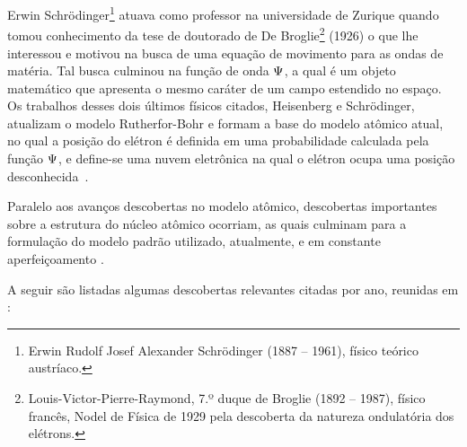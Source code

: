 Erwin Schrödinger\footnote{Erwin Rudolf Josef Alexander Schrödinger (1887 -- 1961), físico teórico austríaco.} atuava como professor na universidade de Zurique quando tomou conhecimento da tese de doutorado de De Broglie\footnote{Louis-Victor-Pierre-Raymond, 7.º duque de Broglie (1892 -- 1987), físico francês, Nodel de Física de 1929 pela descoberta da natureza ondulatória dos elétrons.} (1926) o que lhe interessou e motivou na busca de uma equação de movimento para as ondas de matéria. Tal busca culminou na função de onda $\mathbf\mathrm{\Psi}$, a qual é um objeto matemático que apresenta o mesmo caráter de um campo estendido no espaço. Os trabalhos desses dois últimos físicos citados, Heisenberg e Schrödinger, atualizam o modelo Rutherfor-Bohr e formam a base do modelo atômico atual, no qual a posição do elétron é definida em uma probabilidade calculada pela função $\mathbf\mathrm{\Psi}$, e define-se uma nuvem eletrônica na qual o elétron ocupa uma posição desconhecida~\cite{book:rocha2002}.

Paralelo aos avanços descobertas no modelo atômico, descobertas importantes sobre a estrutura do núcleo atômico ocorriam, as quais culminam para a formulação do modelo padrão utilizado, atualmente, e em constante aperfeiçoamento \cite{book:pinheiro2011}. 

A seguir são listadas algumas descobertas relevantes citadas por ano, reunidas em : 

